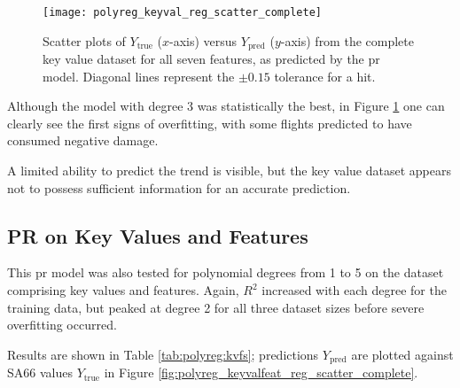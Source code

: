 \begin{figure}[tb!]
    \centering
    \texttt{[image: polyreg\_keyval\_reg\_scatter\_complete]}
    \caption{\label{fig:polyreg_keyval_reg_scatter_complete} Scatter plots of \(Y_\text{true}\) (\(x\)-axis) versus \(Y_\text{pred}\) (\(y\)-axis) from the complete key value dataset for all seven features, as predicted by the \ac{pr} model. Diagonal lines represent the \(\pm0.15\) tolerance for a hit.}
\end{figure}

Although the model with degree 3 was statistically the best, in Figure \ref{fig:polyreg_keyval_reg_scatter_complete} one can clearly see the first signs of overfitting, with some flights predicted to have consumed negative damage.

A limited ability to predict the trend is visible, but the key value dataset appears not to possess sufficient information for an accurate prediction.

\subsection{PR on Key Values and Features} \label{sec:res:polyreg:kvfs}
This \ac{pr} model was also tested for polynomial degrees from 1 to 5 on the dataset comprising key values and features. Again, \(R^2\) increased with each degree for the training data, but peaked at degree 2 for all three dataset sizes before severe overfitting occurred.

Results are shown in Table \ref{tab:polyreg:kvfs}; predictions \(Y_{\text{pred}}\) are plotted against SA66 values \(Y_{\text{true}}\) in Figure \ref{fig:polyreg_keyvalfeat_reg_scatter_complete}.

